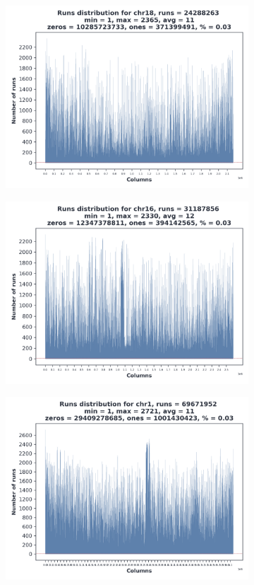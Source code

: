 \begin{figure}
\begin{subfigure}{.45\textwidth}
    \includegraphics[width=\linewidth]{img/18_runs.png}
  \end{subfigure}%
  \begin{subfigure}{.45\textwidth}
    \centering
    \includegraphics[width=\linewidth]{img/16_runs.png}
  \end{subfigure}
  \begin{subfigure}{.45\textwidth}
    \centering
    \includegraphics[width=\linewidth]{img/1_runs.png}

\end{subfigure}
\end{figure}
